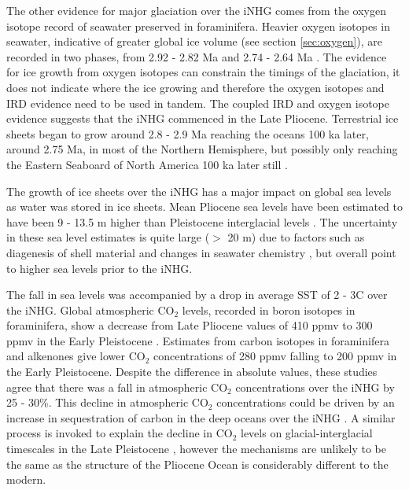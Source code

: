 The other evidence for major glaciation over the iNHG comes from the oxygen isotope record of seawater preserved in foraminifera. Heavier oxygen isotopes in seawater, indicative of greater global ice volume (see section \ref{sec:oxygen}), are recorded in two phases, from 2.92 - 2.82 Ma and 2.74 - 2.64 Ma \citep{bartoliFinalClosurePanama2005}. The evidence for ice growth from oxygen isotopes can constrain the timings of the glaciation, it does not indicate where the ice growing and therefore the oxygen isotopes and IRD evidence need to be used in tandem. The coupled IRD and oxygen isotope evidence suggests that the iNHG commenced in the Late Pliocene. Terrestrial ice sheets began to grow around 2.8 - 2.9 Ma reaching the oceans 100 ka later, around 2.75 Ma, in most of the Northern Hemisphere, but possibly only reaching the Eastern Seaboard of North America 100 ka later still \citep{raymoResponseDeepOcean1992, maslinInitiationNorthernHemisphere1995}.

The growth of ice sheets over the iNHG has a major impact on global sea levels as water was stored in ice sheets. Mean Pliocene sea levels have been estimated to have been 9 - 13.5 m higher than Pleistocene interglacial levels \citep{winnickOxygenIsotopeMassbalance2015}. The uncertainty in these sea level estimates is quite large ($>$ 20 m) due to factors such as diagenesis of shell material and changes in seawater chemistry \citep{raymoAccuracyMidPlioceneD18Obased2018}, but overall point to higher sea levels prior to the iNHG.

The fall in sea levels was accompanied by a drop in average SST of 2 - 3\textdegree C \citep{mcclymontLessonsHighCO2World2020} over the iNHG. Global atmospheric CO$_2$ levels, recorded in boron isotopes in foraminifera, show a decrease from Late Pliocene values of 410 ppmv to 300 ppmv in the Early Pleistocene \citep{bartoliAtmosphericCO2Decline2011}. Estimates from carbon isotopes in foraminifera \citep{pearsonAtmosphericCarbonDioxide2000} and alkenones \citep{badgerHighresolutionAlkenonePalaeobarometry2013} give lower CO$_2$ concentrations of 280 ppmv falling to 200 ppmv in the Early Pleistocene. Despite the difference in absolute values, these studies agree that there was a fall in atmospheric CO$_2$ concentrations over the iNHG by 25 - 30\%. This decline in atmospheric CO$_2$ concentrations could be driven by an increase in sequestration of carbon in the deep oceans over the iNHG \citep{bartoliAtmosphericCO2Decline2011}. A similar process is invoked to explain the decline in CO$_2$ levels on glacial-interglacial timescales in the Late Pleistocene \citep{sigmanGlacialInterglacialVariations2000, sigmanPolarOceanGlacial2010}, however the mechanisms are unlikely to be the same as the structure of the Pliocene Ocean is considerably different to the modern.

